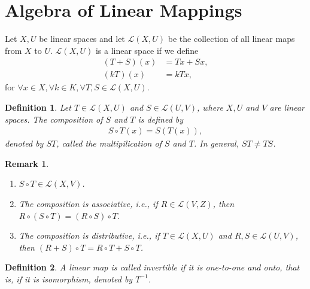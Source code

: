 \documentclass[11pt]{book}
\newtheorem{definition}{Definition}[chapter]
\newtheorem{remark}{Remark}[chapter]
\theoremstyle{definition}
\numberwithin{equation}{chapter}
\begin{document}
\medskip

\section{Algebra of Linear Mappings}
Let $X,U$ be linear spaces and let $\mathscr{L}(X,U)$ be the collection of all linear maps from $X$ to $U$. $\mathscr{L}(X,U)$ is a linear space if we define
\begin{align*}
    (T+S)(x) & = Tx + Sx, \\
    (kT)(x) & = k T x,
\end{align*}
for $\forall x\in X, \forall k\in K, \forall T,S\in \mathscr{L}(X,U)$.

\medskip

\begin{definition}
Let $T\in \mathscr{L}(X,U)$ and $S\in \mathscr{L}(U,V)$, where $X,U$ and $V$ are linear spaces. The composition of $S$ and $T$ is defined by 
\begin{align*}
    S \circ T(x) = S\left(T(x)\right),
\end{align*}
denoted by $ST$, called the multipilication of $S$ and $T$. In general, $ST\neq TS$.
\end{definition}
\begin{remark}
~\begin{enumerate}[label=(\arabic*)]
    \item $S\circ T \in \mathscr{L}(X,V)$.
    \item The composition is associative, i.e., if $R\in \mathscr{L}(V,Z)$, then $R\circ (S\circ T) = (R\circ S)\circ T$.
    \item The composition is distributive, i.e., if $T\in \mathscr{L}(X,U)$ and $R,S \in \mathscr{L}(U,V)$, then $(R+S)\circ T = R\circ T + S\circ T$.
\end{enumerate}
\end{remark}

\medskip

\begin{definition}
A linear map is called invertible if it is one-to-one and onto, that is, if it is isomorphism, denoted by $T^{-1}$.
\end{definition}

\medskip
\end{document}
